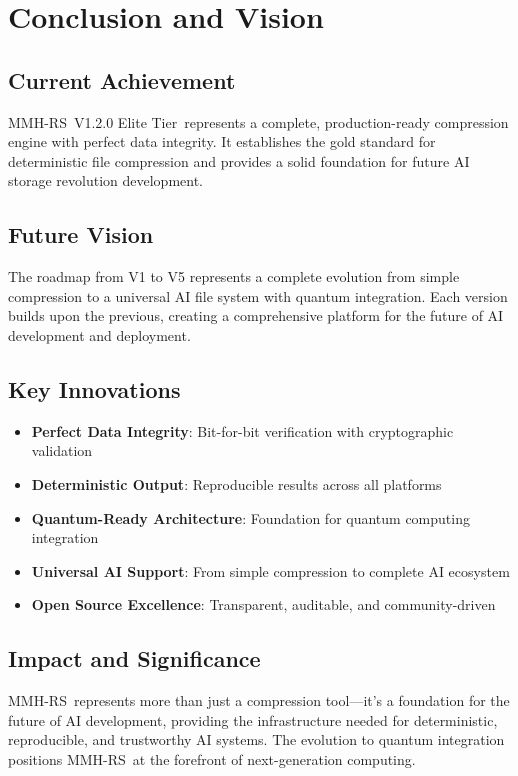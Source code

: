 \documentclass[12pt,a4paper]{article}
\newcommand{\version}{V1.2.0 Elite Tier}
\newcommand{\project}{MMH-RS}
\begin{document}
\newpage

\section{Conclusion and Vision}

\subsection{Current Achievement}
\project\ \version\ represents a complete, production-ready compression engine with perfect data integrity. It establishes the gold standard for deterministic file compression and provides a solid foundation for future AI storage revolution development.

\subsection{Future Vision}
The roadmap from V1 to V5 represents a complete evolution from simple compression to a universal AI file system with quantum integration. Each version builds upon the previous, creating a comprehensive platform for the future of AI development and deployment.

\subsection{Key Innovations}
\begin{itemize}
    \item \textbf{Perfect Data Integrity}: Bit-for-bit verification with cryptographic validation
    \item \textbf{Deterministic Output}: Reproducible results across all platforms
    \item \textbf{Quantum-Ready Architecture}: Foundation for quantum computing integration
    \item \textbf{Universal AI Support}: From simple compression to complete AI ecosystem
    \item \textbf{Open Source Excellence}: Transparent, auditable, and community-driven
\end{itemize}

\subsection{Impact and Significance}
\project\ represents more than just a compression tool—it's a foundation for the future of AI development, providing the infrastructure needed for deterministic, reproducible, and trustworthy AI systems. The evolution to quantum integration positions \project\ at the forefront of next-generation computing.
\end{document}
